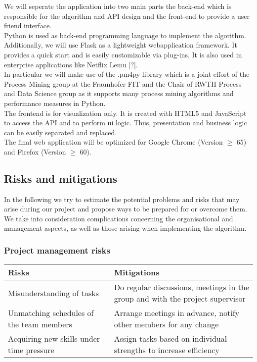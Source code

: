 \documentclass[notitlepage]{article}
\begin{document}
\begin{flushleft}
We will seperate the application into two main parts the back-end which is responsible for the algorithm and API design and the front-end to provide a user friend interface.\\
\medskip
Python is used as back-end programming language to implement the algorithm. Additionally, we will use Flask as a lightweight webapplication framework. 
It provides a quick start and is easily customizable via plug-ins. It is also used in enterprise applications like Netflix Lemu [?].\\
\medskip
In particular we will make use of the .pm4py library which is a joint effort of the Process Mining group at the Fraunhofer FIT and the Chair of
RWTH Process and Data Science group as it supports many process mining algorithms and performance measures in Python.\\
\medskip
The frontend is for visualization only. It is created with HTML5 and JavaScript to access the API and to perform ui logic. 
Thus, presentation and business logic can be easily separated and replaced.\\
\medskip
The final web application will be optimized for Google Chrome (Version $\geq$ 65) and Firefox (Version $\geq$ 60).


\subsection{Risks and mitigations}
In the following we try to estimate the potential problems and risks that may arise during our project and propose ways to be prepared for or overcome them.
We take into consideration complications concerning the organisational and management aspects, as well as those arising when implementing the algorithm.

\subsubsection{Project management risks}

\begin{tabularx}{15cm}{|X|X|}
\hline
\textbf{Risks} &\textbf{Mitigations}\\
\hline
Misunderstanding of tasks & Do regular discussions, meetings in the group and with the project supervisor\\
\hline
Unmatching schedules of the team members & Arrange meetings in advance, notify other members for any change  \\
\hline
Acquiring new skills under time pressure & Assign tasks based on individual strengths to increase efficiency \\ 
\hline
\end{tabularx}\\ 



\end{flushleft}
\end{document}
